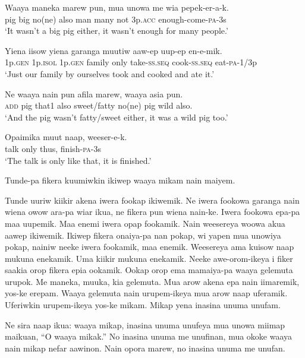 \ea
\gll  Waaya  maneka  marew  pun,  mua  unowa  me  wia  pepek-er-a-k. \\
pig  big  no(ne)  also  man  many  not  3p.\textsc{acc}  enough-come-\textsc{pa}-3s \\
\glt ‘It wasn’t a big pig either, it wasn’t enough for many people.’ \\
\z


\ea
\gll  Yiena  iisow  yiena  garanga  muutiw  aaw-ep  uup-ep         en-e-mik. \\
1p.\textsc{gen}  1p.\textsc{isol}  1p.\textsc{gen}  family  only  take-\textsc{ss.seq}  cook-\textsc{ss.seq}    eat-\textsc{pa}-1/3p \\


\glt ‘Just our family by ourselves took and cooked and ate it.’ \\
\z


\ea
\gll  Ne  waaya  nain  pun  afila  marew,  waaya  asia  pun. \\
\textsc{add}  pig  that1  also  sweet/fatty  no(ne)  pig  wild  also. \\
\glt ‘And the pig wasn’t fatty/sweet either, it was a wild pig too.’ \\
\z


\ea
\gll  Opaimika  muut  naap,  weeser-e-k. \\
talk  only  thus,  finish-\textsc{pa}-3s \\
\glt ‘The talk is only like that, it is finished.’ \\
\z

Tunde-pa  fikera  kuumiwkin  ikiwep  waaya mikam  nain  maiyem.

Tunde  uuriw  kiikir  akena  iwera  fookap  ikiwemik. 
Ne  iwera  fookowa  garanga  nain  wiena  owow  ara-pa wiar  ikua,  ne  fikera  pun  wiena  nain-ke. 
Iwera  fookowa  epa-pa  maa  uupemik. 
Maa  enemi  iwera  opap  fookamik. 
Nain  weesereya  woowa  akua  aawep  ikiwemik. 
Ikiwep  fikera  onaiya-pa  nan  pokap,  wi  yapen  mua            unowiya  pokap,  nainiw  neeke  iwera  fookamik, maa  enemik. 
Weesereya  ama  kuisow  naap  mukuna  enekamik. 
Uma  kiikir  mukuna  enekamik. 
Neeke  awe-orom-ikeya  i  fiker  saakia orop  fikera  epia  ookamik. 
Ookap  orop  ema  mamaiya-pa  waaya  gelemuta  urupok. 
Me  maneka,  muuka,  kia  gelemuta. 
Mua  arow  akena  epa  nain  iimaremik,  yos-ke  erepam.
Waaya  gelemuta  nain  urupem-ikeya  mua  arow  naap  uferamik. 
Uferiwkin  urupem-ikeya  yos-ke  mikam. 
Mikap  yena  inasina  unuma  unufam. 

Ne  sira  naap  ikua:  waaya  mikap,  inasina  unuma  unufeya mua  unowa  miimap  maikuan,  ``O  waaya  mikak.” 
No  inasina  unuma  me  unufinan,  mua  okoke  waaya  nain    mikap  nefar  aawinon. 
Nain  opora  marew,  no  inasina  unuma  me  unufan.

